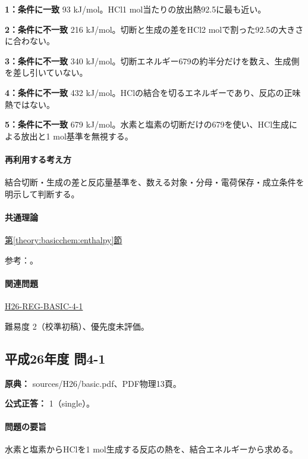 \noindent\textbf{1：条件に一致} 93 kJ/mol。HCl1 mol当たりの放出熱92.5に最も近い。\par

\noindent\textbf{2：条件に不一致} 216 kJ/mol。切断と生成の差をHCl2 molで割った92.5の大きさに合わない。\par

\noindent\textbf{3：条件に不一致} 340 kJ/mol。切断エネルギー679の約半分だけを数え、生成側を差し引いていない。\par

\noindent\textbf{4：条件に不一致} 432 kJ/mol。HClの結合を切るエネルギーであり、反応の正味熱ではない。\par

\noindent\textbf{5：条件に不一致} 679 kJ/mol。水素と塩素の切断だけの679を使い、HCl生成による放出と1 mol基準を無視する。\par

\paragraph{再利用する考え方} 結合切断・生成の差と反応量基準を、数える対象・分母・電荷保存・成立条件を明示して判断する。

\paragraph{共通理論} \hyperref[theory:basicchem:enthalpy]{第\ref*{theory:basicchem:enthalpy}節}

\par 参考：\cite{mit_bond_enthalpy}。

\paragraph{関連問題} \hyperref[q:h26-reg-basic-4-1]{H26-REG-BASIC-4-1}

\par 難易度 2（校準初稿）、優先度未評価。

\subsection{平成26年度 問4-1}
\label{q:h26-reg-basic-4-1}

\noindent\textbf{原典：} sources/H26/basic.pdf、PDF物理13頁。

\textbf{公式正答：} 1（single）。

\paragraph{問題の要旨} 水素と塩素からHClを1 mol生成する反応の熱を、結合エネルギーから求める。

